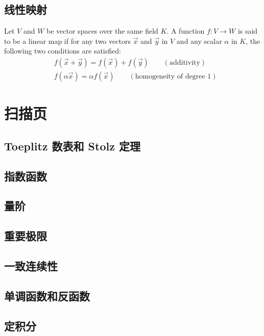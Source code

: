 \documentclass{book}
\numberwithin{equation}{section}
\numberwithin{figure}{section}
\theoremstyle{definition}
\begin{document}
\section{线性映射}
Let $V$ and $W$ be vector spaces over the same field $K$. A function $f: V \to W$ is said to be a linear map if for any two vectors $\vec{x}$ and $\vec{y}$ in $V$ and any scalar $\alpha$ in $K$, the following two conditions are satisfied:
\begin{align*}
  &f(\vec{x}+\vec{y})=f(\vec{x})+f(\vec{y})\qquad(\text{additivity})\\
  &f(\alpha\vec{x})=\alpha f(\vec{x})\qquad(\text{homogeneity of degree 1})
\end{align*}
\chapter{扫描页}
\section{Toeplitz 数表和 Stolz 定理}
\hypertarget{scan:Toeplitz}{}

\section{指数函数}
\hypertarget{scan:TwoLemmasForExponent}{}


\hypertarget{scan:ExponentFunction}{}

\section{量阶}
\hypertarget{scan:ExponentFunctionPowerFunctionLogFunction}{}

\section{重要极限}
\hypertarget{scan:ImportantLimit}{}

\section{一致连续性}
\hypertarget{proof:yizhilianxuxingdingli}{}

\hypertarget{proof:yizhilianxuxingTwoDefinitions}{}

\section{单调函数和反函数}
\hypertarget{scan:dandiao}{}

\section{定积分}
\hypertarget{scan:IntegratableHasBoundary}{}

\end{document}
